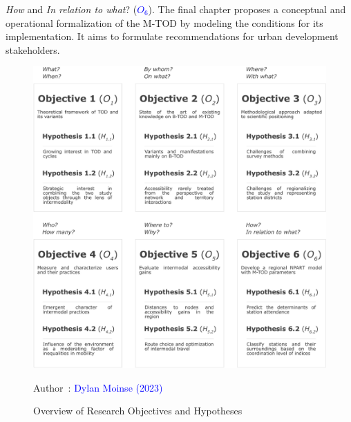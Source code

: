 \begin{refsegment}
\begin{customitemize}
    \item \textsl{How} and \textsl{In relation to what}? ({\textcolor{blue}{\(O_6\)}\label{objectif-6}}). The final chapter proposes a conceptual and operational formalization of the \acrshort{M-TOD} by modeling the conditions for its implementation. It aims to formulate recommendations for urban development stakeholders.
        \end{customitemize}%

    \begin{figure}[h!]\vspace*{4pt}
        \caption{Overview of Research Objectives and Hypotheses}
        \label{fig-introduction:objectifs-hypotheses}
        \centerline{\includegraphics[width=1\columnwidth]{src/Figures/Introduction/EN_Objectifs_recherche.pdf}}
        \vspace{5pt}
        \begin{flushright}\scriptsize{
        Author~: \textcolor{blue}{Dylan Moinse (2023)}
        }\end{flushright}
    \end{figure}


\end{refsegment}
